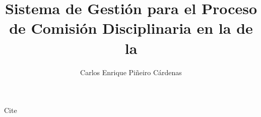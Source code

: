 \documentclass[spanish,noloa,nolol,pagelimitmode=flex,authorshippage=ltd]{thesis} [2015/30/06 v1.0]
\author{Carlos Enrique Piñeiro Cárdenas}
\title{Sistema de Gestión para el Proceso de Comisión Disciplinaria en la \fac de la \uci}
\begin{document}
  \maketitle
  
  Cite \cite{Autodesk2019}
  
  
  
  
  
  
  
  
\end{document}
